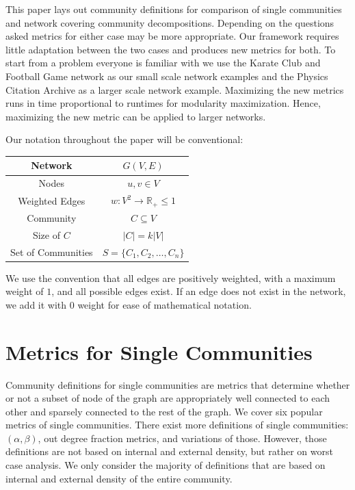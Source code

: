 \documentclass[conference]{IEEEtran}
\begin{document}
This paper lays out community definitions for comparison of single communities and network covering community decompositions.  Depending on the questions asked metrics for either case may be more appropriate.  Our framework requires little adaptation between the two cases and produces new metrics for both.  To start from a problem everyone is familiar with we use the Karate Club and Football Game network as our small scale network examples and the Physics Citation Archive as a larger scale network example.  Maximizing the new metrics runs in time proportional to runtimes for modularity maximization.  Hence, maximizing the new metric can be applied to larger networks.

Our notation throughout the paper will be conventional:
\begin{center}
\begin{tabular}{|c|c|}
\hline  Network & $G(V, E)$\\ \hline 
Nodes & $u,v \in V$ \\ \hline
Weighted Edges & $w: V^2 \rightarrow \mathbb{R}_+ \leq 1$ \\ \hline
Community & $C \subseteq V$ \\ \hline
Size of $C$ & $|C| = k |V|$ \\ \hline
Set of Communities & $S = \{C_1, C_2, \dots, C_n\}$ \\ \hline
\end{tabular}
\end{center}
We use the convention that all edges are positively weighted, with a maximum weight of $1$, and all possible edges exist.  If an edge does not exist in the network, we add it with $0$ weight for ease of mathematical notation.

\section{Metrics for Single Communities}

Community definitions for single communities are metrics that determine whether or not a subset of node of the graph are appropriately well connected to each other and sparsely connected to the rest of the graph.  We cover six popular metrics of single communities.
There exist more definitions of single communities: $(\alpha, \beta)$, out degree fraction metrics, and variations of those.  However, those definitions are not based on internal and external density, but rather on worst case analysis.  We only consider the majority of definitions that are based on internal and external density of the entire community.
\end{document}
